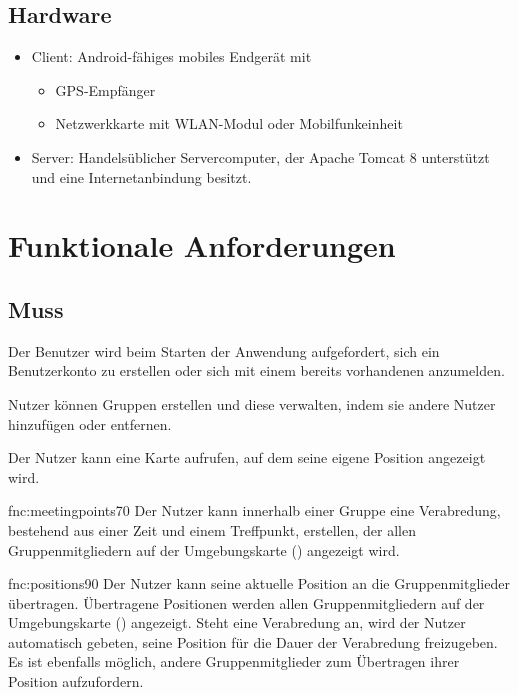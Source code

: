 \documentclass[parskip=full,11pt]{scrartcl}
\begin{document}
\subsection{Hardware}
\begin{itemize}
    \item Client: Android-fähiges mobiles Endgerät mit
        \begin{itemize}
            \item GPS-Empfänger
            \item Netzwerkkarte mit WLAN-Modul oder Mobilfunkeinheit
        \end{itemize}
    \item Server: Handelsüblicher Servercomputer, der Apache Tomcat 8
        unterstützt und eine Internetanbindung besitzt.
\end{itemize}

\section{Funktionale Anforderungen}

\subsection{Muss}

Der Benutzer wird beim Starten der Anwendung aufgefordert, sich ein
Benutzerkonto zu erstellen oder sich mit einem bereits vorhandenen anzumelden.

Nutzer können Gruppen erstellen und diese verwalten, indem sie andere Nutzer
hinzufügen oder entfernen.

Der Nutzer kann eine Karte aufrufen, auf dem seine eigene Position angezeigt
wird.

    {fnc:meetingpoints}{70}
Der Nutzer kann innerhalb einer Gruppe eine Verabredung, bestehend aus einer
Zeit und einem Treffpunkt, erstellen, der allen Gruppenmitgliedern auf der
Umgebungskarte () angezeigt wird.

    {fnc:positions}{90}
Der Nutzer kann seine aktuelle Position an die Gruppenmitglieder übertragen.
Übertragene Positionen werden allen Gruppenmitgliedern auf der Umgebungskarte
() angezeigt.
Steht eine Verabredung an, wird der Nutzer automatisch gebeten, seine Position
für die Dauer der Verabredung freizugeben.
Es ist ebenfalls möglich, andere Gruppenmitglieder zum Übertragen ihrer
Position aufzufordern.
\end{document}
